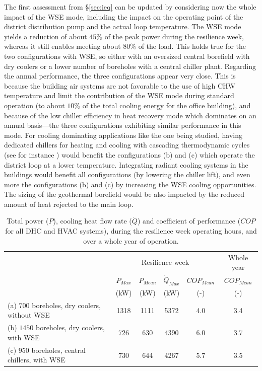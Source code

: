 The first assessment from §\ref{sec:ieq} can be updated by considering now the whole impact of the WSE mode, including the impact on the operating point of the district distribution pump and the actual loop temperature.
The WSE mode yields a reduction of about $45\%$ of the peak power during the resilience week, whereas it still enables meeting about $80\%$ of the load. This holds true for the two configurations with WSE, so either with an oversized central borefield with dry coolers or a lower number of boreholes with a central chiller plant.
Regarding the annual performance, the three configurations appear very close.
This is because the building air systems are not favorable to the use of high CHW temperature and limit the contribution of the WSE mode during standard operation (to about $10\%$ of the total cooling energy for the office building), and because of the low chiller efficiency in heat recovery mode which dominates on an annual basis---the three configurations exhibiting similar performance in this mode.
For cooling dominating applications like the one being studied, having dedicated chillers for heating and cooling with cascading thermodynamic cycles (see for instance \cite{Cline2020}) would benefit the configurations (b) and (c) which operate the district loop at a lower temperature. Integrating radiant cooling systems in the buildings would benefit all configurations (by lowering the chiller lift), and even more the configurations (b) and (c) by increasing the WSE cooling opportunities. The sizing of the geothermal borefield would be also impacted by the reduced amount of heat rejected to the main loop.


\begin{table}[!htbp]
    \caption{Total power ($P$), cooling heat flow rate ($\dot{Q}$) and coefficient of performance ($COP$ for all DHC and HVAC systems), during the resilience week operating hours, and over a whole year of operation.}\label{tab:performance}
    \centering
    \begin{tabular}{>{\raggedright\arraybackslash}p{4.5cm}ccccc}
        \toprule
        \multirow{4}{*}{Configuration} & \multicolumn{4}{c}{Resilience week} & Whole year \\
        \cmidrule(l{5pt}r{5pt}){2-5} \cmidrule(l{5pt}r{5pt}){6-6}
        & $P_{Max}$  & $P_{Mean}$ & $\dot{Q}_{Max}$ & $COP_{Mean}$ & $COP_{Mean}$  \\
        & (kW) & (kW) & (kW) & (-) & (-) \\
        \midrule
        (a) $700$ boreholes, dry coolers, without WSE & 1318 & 1111 & 5372 & 4.0 & 3.4 \\
        (b) $1450$ boreholes, dry coolers, with WSE & 726 & 630 & 4390 & 6.0 & 3.7 \\
        (c) $950$ boreholes, central chillers, with WSE & 730 & 644 & 4267 & 5.7 & 3.5 \\
        \bottomrule
    \end{tabular}
\end{table}


